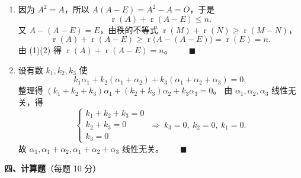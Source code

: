 \documentclass[12pt]{ctexart}
\newcommand{\rank}{\operatorname{r}}
\begin{document}
\begin{enumerate}[label=\textbf{\arabic*.},itemsep=11pt]
\item 因为 $A^{2}=A$，所以 $A(A-E)=A^{2}-A=O$，于是
  \[
  \rank(A)+\rank(A-E)\leq n. \tag{1}
  \]
  又 $A-(A-E)=E$，由秩的不等式 $\rank(M)+\rank(N)\geq\rank(M-N)$，
  \[
  \rank(A)+\rank(A-E)\geq\rank\big(A-(A-E)\big)=\rank(E)=n. \tag{2}
  \]
  由 (1)(2) 得 $\rank(A)+\rank(A-E)=n$。$\qquad\blacksquare$

\item 设有数 $k_1,k_2,k_3$ 使
  \[
  k_1\alpha_1+k_2(\alpha_1+\alpha_2)+k_3(\alpha_1+\alpha_2+\alpha_3)=0,
  \]
  整理得 $(k_1+k_2+k_3)\alpha_1+(k_2+k_3)\alpha_2+k_3\alpha_3=0$。
  由 $\alpha_1,\alpha_2,\alpha_3$ 线性无关，得
  \[
  \begin{cases}k_1+k_2+k_3=0\\ k_2+k_3=0\\ k_3=0\end{cases}
  \ \Rightarrow\ k_3=0,\ k_2=0,\ k_1=0.
  \]
  故 $\alpha_1,\alpha_1+\alpha_2,\alpha_1+\alpha_2+\alpha_3$ 线性无关。$\qquad\blacksquare$
\end{enumerate}

\vspace{6pt}
\noindent\textbf{四、计算题}（每题 10 分）
\end{document}
